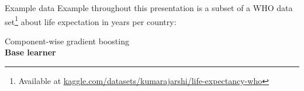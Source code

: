 \documentclass[t,10pt]{beamer}
\newcommand{\fSlide}[2]{
\begin{frame}[plain]{}%
  \vspace{4cm}%
  \Large #1\\[0.2cm]%
  {\LARGE\textbf{#2}}%
	\addtocounter{framenumber}{-1}%
\end{frame}%
}
\begin{document}
\begin{frame}{Example data}
  Example throughout this presentation is a subset of a WHO data set\footnote[frame,1]{Available at \url{kaggle.com/datasets/kumarajarshi/life-expectancy-who}} about life expectation in years per country:

  \scriptsize
  
  \normalsize

\end{frame}

%
%
%

\fSlide{Component-wise gradient boosting}{Base learner}
\end{document}
